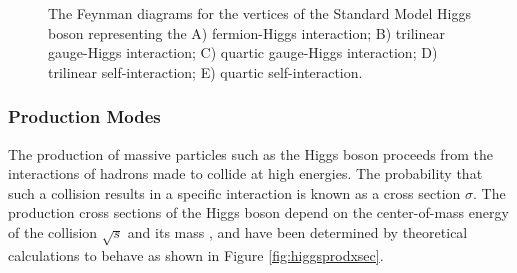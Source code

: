 \begin{figure}[htbp]
{     \qquad
  }
  \caption[Higgs Boson Interaction Vertices]{The Feynman diagrams for the vertices of the Standard Model Higgs boson representing the A) fermion-Higgs interaction; B) trilinear gauge-Higgs interaction; C) quartic gauge-Higgs interaction; D) trilinear self-interaction; E) quartic self-interaction.}
  \label{fig:higgsvertices}
\end{figure}
 
\subsubsection{Production Modes}

The production of massive particles such as the Higgs boson proceeds from the interactions of hadrons made to collide at high energies. The probability that such a collision results in a specific interaction is known as a cross section $\sigma$. The production cross sections of the Higgs boson depend on the center-of-mass energy of the collision $\sqrt{s}$ and its mass \massH, and have been determined by theoretical calculations to behave as shown in Figure \ref{fig:higgsprodxsec}.

